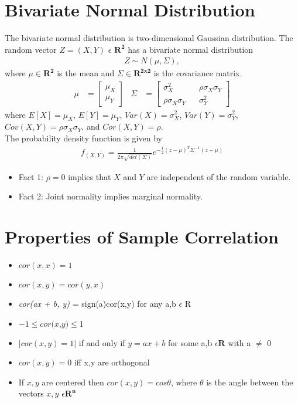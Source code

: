 \documentclass[11pt]{article}
\begin{document}
\section{Bivariate Normal Distribution}
The bivariate normal distribution is two-dimensional Gaussian distribution. The random vector $Z = (X,Y)$ $\epsilon$ $\mathbf{R^2}$ has a bivariate normal distribution
\begin{align}
Z \sim N(\mu, \Sigma),
\end{align}
where $\mu \in \mathbf{R^2}$ is the mean and $\Sigma \in \mathbf{R^{2x2}}$ is the covariance matrix.\\
\begin{align}
\mu &= \begin{bmatrix}\mu_X \\ \mu_Y\end{bmatrix} &
\Sigma &= \begin{bmatrix}\sigma^2_X && \rho\sigma_X\sigma_Y \\ \rho\sigma_X\sigma_Y && \sigma^2_Y \end{bmatrix}
\end{align}
where $E[X] = \mu_X$, $E[Y] = \mu_Y$, $Var(X)=\sigma^2_X$, $Var(Y)=\sigma^2_Y$, $Cov(X,Y)=\rho\sigma_X\sigma_Y$, and $Cor(X,Y)=\rho$.\\

The probability density function is given by
\begin{align}
f_(X,Y) = \frac{1}{2\pi\sqrt{det(\Sigma)}}e^{-\frac{1}{2}(z-\mu)^T\Sigma^{-1}(z-\mu)}
\end{align}

\begin{itemize}
\item Fact 1: $\rho = 0$ implies that $X$ and $Y$ are independent of the random variable.
\item Fact 2: Joint normality implies marginal normality.
\end{itemize}

\section{Properties of Sample Correlation}

\begin{itemize}
\item $cor(x,x) = 1$
\item $cor(x,y) = cor(y,x)$
\item \textit{cor(ax + b, y)} = sign(a)cor(x,y) for any a,b $\epsilon$ R
\item $-1 \leq \textit{cor(x,y)}  \leq 1 $
\item $|cor(x,y)  =  1|$ if and only if $y = ax + b$ for some a,b $\epsilon \mathbf{R}$ with a $\neq$ 0
\item $cor(x,y) = 0$ iff x,y are orthogonal
\item If $x,y$ are centered then $cor(x,y) = cos\theta$, where $\theta$ is the angle between the vectors $x,y$ $\epsilon \mathbf{R^n}$ 



\end{itemize}
\end{document}

